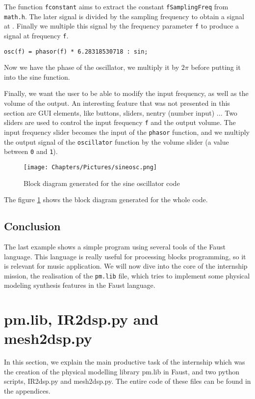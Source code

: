 The function \texttt{fconstant} aims to extract the constant \texttt{fSamplingFreq} from \texttt{math.h}. The later signal is divided by the sampling frequency to obtain a signal at . Finally we multiple this signal by the frequency parameter \texttt{f} to produce a signal at frequency \texttt{f}.

\texttt{osc(f) = phasor(f) * 6.28318530718 : sin;}

Now we have the phase of the oscillator, we multiply it by $2 \pi$ before putting it into the sine function.

Finally, we want the user to be able to modify the input frequency, as well as the volume of the output. An interesting feature that was not presented in this section are GUI elements, like buttons, sliders, nentry (number input) ...
Two sliders are used to control the input frequency \texttt{f} and the output volume. The input frequency slider becomes the input of the \texttt{phasor} function, and we multiply the output signal of the \texttt{oscillator} function by the volume slider (a value between \texttt{0} and \texttt{1}).

\begin{figure}[ht]
    \centering
    \texttt{[image: Chapters/Pictures/sineosc.png]}
    \caption{Block diagram generated for the sine oscillator code}
    \label{fig:sineosc}
\end{figure}

The figure \ref{fig:sineosc} shows the block diagram generated for the whole code.

\subsection{Conclusion}

The last example shows a simple program using several tools of the Faust language. This language is really useful for processing blocks programming, so it is relevant for music application. We will now dive into the core of the internship mission, the realisation of the \texttt{pm.lib} file, which tries to implement some physical modeling synthesis features in the Faust language.

\section{pm.lib, IR2dsp.py and mesh2dsp.py}

In this section, we explain the main productive task of the internship which was the creation of the physical modelling library pm.lib in Faust, and two python scripts, IR2dsp.py and mesh2dsp.py. The entire code of these files can be found in the appendices.

